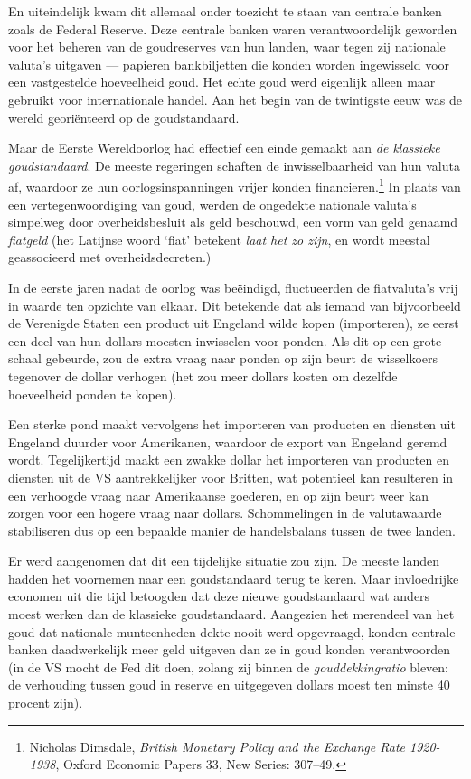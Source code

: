 \documentclass[
  a5paper,
  smalldemyvopaper,11pt,twoside,onecolumn,openright,extrafontsizes,
hidelinks]{memoir}
\begin{document}
En uiteindelijk kwam dit allemaal onder toezicht te staan van centrale
banken zoals de Federal Reserve. Deze centrale banken waren
verantwoordelijk geworden voor het beheren van de goudreserves van hun
landen, waar tegen zij nationale valuta's uitgaven --- papieren
bankbiljetten die konden worden ingewisseld voor een vastgestelde
hoeveelheid goud. Het echte goud werd eigenlijk alleen maar gebruikt
voor internationale handel. Aan het begin van de twintigste eeuw was de
wereld georiënteerd op de goudstandaard.

Maar de Eerste Wereldoorlog had effectief een einde gemaakt aan \emph{de
klassieke goudstandaard}. De meeste regeringen schaften de
inwisselbaarheid van hun valuta af, waardoor ze hun oorlogsinspanningen
vrijer konden financieren.\footnote{\hspace{0pt}Nicholas Dimsdale,
  \emph{British Monetary Policy and the Exchange Rate 1920-1938}, Oxford
  Economic Papers 33, New Series: 307--49.} In plaats van een
vertegenwoordiging van goud, werden de ongedekte nationale valuta's
simpelweg door overheidsbesluit als geld beschouwd, een vorm van geld
genaamd \emph{fiatgeld} (het Latijnse woord `fiat' betekent \emph{laat
het zo zijn}, en wordt meestal geassocieerd met overheidsdecreten.)

In de eerste jaren nadat de oorlog was beëindigd, fluctueerden de
fiatvaluta's vrij in waarde ten opzichte van elkaar. Dit betekende dat
als iemand van bijvoorbeeld de Verenigde Staten een product uit Engeland
wilde kopen (importeren), ze eerst een deel van hun dollars moesten
inwisselen voor ponden. Als dit op een grote schaal gebeurde, zou de
extra vraag naar ponden op zijn beurt de wisselkoers tegenover de dollar
verhogen (het zou meer dollars kosten om dezelfde hoeveelheid ponden te
kopen).

Een sterke pond maakt vervolgens het importeren van producten en
diensten uit Engeland duurder voor Amerikanen, waardoor de export van
Engeland geremd wordt. Tegelijkertijd maakt een zwakke dollar het
importeren van producten en diensten uit de VS aantrekkelijker voor
Britten, wat potentieel kan resulteren in een verhoogde vraag naar
Amerikaanse goederen, en op zijn beurt weer kan zorgen voor een hogere
vraag naar dollars. Schommelingen in de valutawaarde stabiliseren dus op
een bepaalde manier de handelsbalans tussen de twee landen.

Er werd aangenomen dat dit een tijdelijke situatie zou zijn. De meeste
landen hadden het voornemen naar een goudstandaard terug te keren. Maar
invloedrijke economen uit die tijd betoogden dat deze nieuwe
goudstandaard wat anders moest werken dan de klassieke goudstandaard.
Aangezien het merendeel van het goud dat nationale munteenheden dekte
nooit werd opgevraagd, konden centrale banken daadwerkelijk meer geld
uitgeven dan ze in goud konden verantwoorden (in de VS mocht de Fed dit
doen, zolang zij binnen de \emph{gouddekkingratio} bleven: de verhouding
tussen goud in reserve en uitgegeven dollars moest ten minste 40 procent
zijn).
\end{document}
